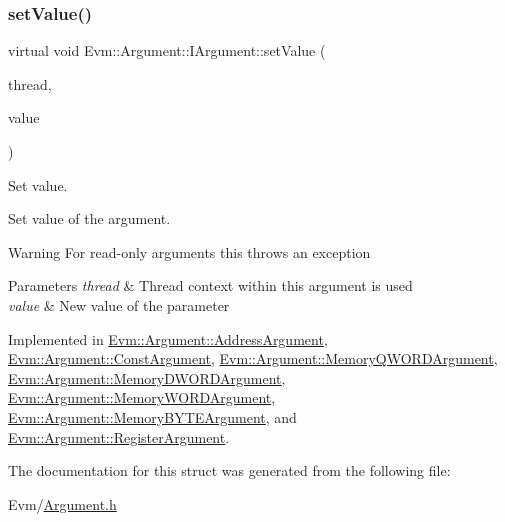 \subsubsection{\texorpdfstring{set\+Value()}{setValue()}}
{\footnotesize\ttfamily virtual void Evm\+::\+Argument\+::\+I\+Argument\+::set\+Value (\begin{DoxyParamCaption}\item[{\mbox{\hyperlink{struct_evm_1_1_thread_context}{Thread\+Context}} \&}]{thread,  }\item[{uint64\+\_\+t}]{value }\end{DoxyParamCaption})\hspace{0.3cm}{\ttfamily [pure virtual]}}



Set value. 

Set value of the argument. \begin{DoxyWarning}{Warning}
For read-\/only arguments this throws an exception 
\end{DoxyWarning}

\begin{DoxyParams}{Parameters}
{\em thread} & Thread context within this argument is used \\
\hline
{\em value} & New value of the parameter \\
\hline
\end{DoxyParams}


Implemented in \mbox{\hyperlink{struct_evm_1_1_argument_1_1_address_argument_a2fa90885150424134b181ff01704e798}{Evm\+::\+Argument\+::\+Address\+Argument}}, \mbox{\hyperlink{struct_evm_1_1_argument_1_1_const_argument_ab456fa9175551b4c04815ccd65c76bd2}{Evm\+::\+Argument\+::\+Const\+Argument}}, \mbox{\hyperlink{struct_evm_1_1_argument_1_1_memory_q_w_o_r_d_argument_aff2a33f879d440a90c93a7635c5d705a}{Evm\+::\+Argument\+::\+Memory\+Q\+W\+O\+R\+D\+Argument}}, \mbox{\hyperlink{struct_evm_1_1_argument_1_1_memory_d_w_o_r_d_argument_ad1b0d692889006c0db43740f099d8689}{Evm\+::\+Argument\+::\+Memory\+D\+W\+O\+R\+D\+Argument}}, \mbox{\hyperlink{struct_evm_1_1_argument_1_1_memory_w_o_r_d_argument_a9572abaa123939edd7c724074ac3b7ec}{Evm\+::\+Argument\+::\+Memory\+W\+O\+R\+D\+Argument}}, \mbox{\hyperlink{struct_evm_1_1_argument_1_1_memory_b_y_t_e_argument_a6da25d3c59f1676c39ac8f0f0f211863}{Evm\+::\+Argument\+::\+Memory\+B\+Y\+T\+E\+Argument}}, and \mbox{\hyperlink{struct_evm_1_1_argument_1_1_register_argument_afc97b81c554d6f77c9736178c54816cc}{Evm\+::\+Argument\+::\+Register\+Argument}}.



The documentation for this struct was generated from the following file\+:\begin{DoxyCompactItemize}
\item 
Evm/\mbox{\hyperlink{_argument_8h}{Argument.\+h}}\end{DoxyCompactItemize}
